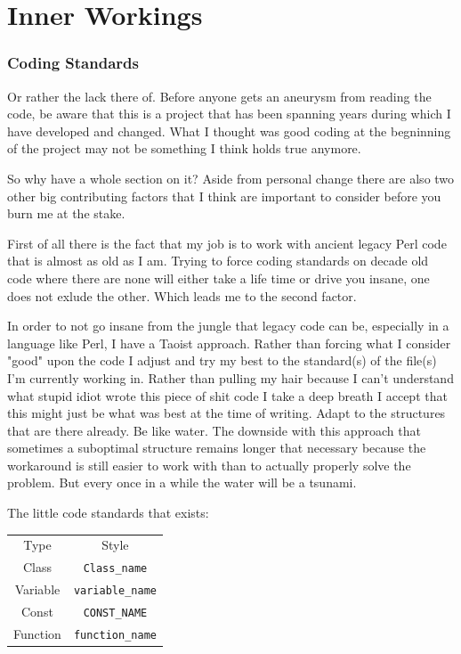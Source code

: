 \part{Inner Workings}

\section{Coding Standards}
Or rather the lack there of. Before anyone gets an aneurysm from reading the code, be aware that this is a project that has been spanning years during which I have developed and changed. What I thought was good coding at the begninning of the
project may not be something I think holds true anymore. 

So why have a whole section on it? 
Aside from personal change there are also two other big contributing factors that I think are important to consider before you burn me at the stake.

First of all there is the fact that my job is to work with ancient legacy Perl code that is almost as old as I am. 
Trying to force coding standards on decade old code where there are none will either take a life time or drive you insane, one does not exlude the other.
Which leads me to the second factor.

In order to not go insane from the jungle that legacy code can be, especially in a language like Perl, I have a Taoist approach.
Rather than forcing what I consider "good" upon the code I adjust and try my best to the standard(s) of the file(s) I'm currently working in.
Rather than pulling my hair because I can't understand what stupid idiot wrote this piece of shit code I take a deep breath I accept that this might just be what was best at the time of writing. 
Adapt to the structures that are there already.
Be like water.
The downside with this approach that sometimes a suboptimal structure remains longer that necessary because the workaround is still easier to work with than to actually properly solve the problem. 
But every once in a while the water will be a tsunami.

The little code standards that exists:
\begin{tabular}{c|c}
	Type & Style \\
	Class & \verb|Class_name| \\
	Variable & \verb|variable_name| \\
	Const & \verb|CONST_NAME| \\
	Function & \verb|function_name| 
\end{tabular}

